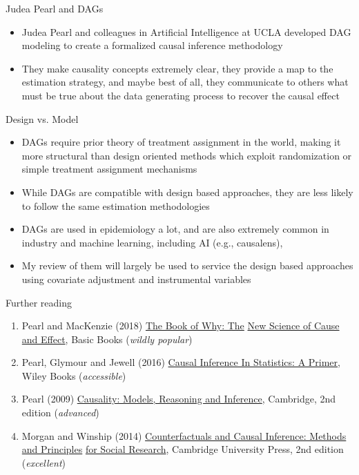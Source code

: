 \documentclass{beamer}
\begin{document}
\begin{frame}{Judea Pearl and DAGs}


  \begin{itemize}
    \item Judea Pearl and colleagues in Artificial Intelligence at UCLA developed DAG modeling to create a formalized causal inference methodology
    \item They make causality concepts extremely clear, they provide a map to the estimation strategy, and maybe best of all, they communicate to others what must be true about the data generating process to recover the causal effect
  \end{itemize}

\end{frame}

\begin{frame}{Design vs. Model}

  \begin{itemize}
    \item DAGs require prior theory of treatment assignment in the world, making it more structural than design oriented methods which exploit randomization or simple treatment assignment mechanisms 
  	\item While DAGs are  compatible with design based approaches, they are less likely to follow the same estimation methodologies
    \item DAGs are used in epidemiology a lot, and are also extremely common in industry and machine learning, including AI (e.g., causalens), 
    \item My review of them will largely be used to service the design based approaches using covariate adjustment and instrumental variables
  \end{itemize}

\end{frame}


\begin{frame}{Further reading}

  \begin{enumerate}

    \item Pearl and MacKenzie (2018) \underline{The Book of Why: The} \underline{New Science of Cause and Effect}, Basic Books (\emph{wildly popular})
    \item Pearl, Glymour and Jewell (2016) \underline{Causal Inference In Statistics: A Primer}, Wiley Books (\emph{accessible})
    \item Pearl (2009) \underline{Causality: Models, Reasoning and Inference}, Cambridge, 2nd edition (\emph{advanced})
    \item Morgan and Winship (2014) \underline{Counterfactuals and Causal Inference: Methods and Principles} \underline{for Social Research}, Cambridge University Press, 2nd edition (\emph{excellent})
  \end{enumerate}

\end{frame}
\end{document}

